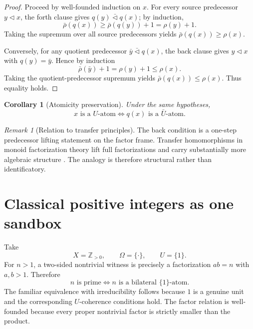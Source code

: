 \documentclass[11pt]{article}
\newtheorem{corollary}[theorem]{Corollary}
\theoremstyle{definition}
\theoremstyle{remark}
\newtheorem{remark}[theorem]{Remark}
\begin{document}
\begin{proof}
Proceed by well-founded induction on \(x\). For every source predecessor \(y\triangleleft x\), the forth clause gives \(q(y)\bar\triangleleft q(x)\); by induction,
\[
\bar\rho(q(x))\ge \bar\rho(q(y))+1=\rho(y)+1.
\]
Taking the supremum over all source predecessors yields \(\bar\rho(q(x))\ge\rho(x)\).

Conversely, for any quotient predecessor \(\bar y\bar\triangleleft q(x)\), the back clause gives \(y\triangleleft x\) with \(q(y)=\bar y\). Hence by induction
\[
\bar\rho(\bar y)+1=\rho(y)+1\le\rho(x).
\]
Taking the quotient-predecessor supremum yields \(\bar\rho(q(x))\le\rho(x)\). Thus equality holds.
\end{proof}

\begin{corollary}[Atomicity preservation]
Under the same hypotheses,
\begin{equation}
\boxed{x\text{ is a }U\text{-atom}\iff q(x)\text{ is a }\bar U\text{-atom}.}
\label{eq:atompreserve}
\end{equation}
\end{corollary}

\begin{remark}[Relation to transfer principles]
The back condition is a one-step predecessor lifting statement on the factor frame. Transfer homomorphisms in monoid factorization theory lift full factorizations and carry substantially more algebraic structure \cite{GeroldingerHalterKoch2006}. The analogy is therefore structural rather than identificatory.
\end{remark}

\section{Classical positive integers as one sandbox}

Take
\begin{equation}
X=\mathbb Z_{>0},\qquad \Omega=\{\cdot\},\qquad U=\{1\}.
\label{eq:integersandbox}
\end{equation}
For \(n>1\), a two-sided nontrivial witness is precisely a factorization \(ab=n\) with \(a,b>1\). Therefore
\begin{equation}
\boxed{n\text{ is prime}\iff n\text{ is a bilateral }\{1\}\text{-atom}.}
\label{eq:primeexample}
\end{equation}
The familiar equivalence with irreducibility follows because \(1\) is a genuine unit and the corresponding \(U\)-coherence conditions hold. The factor relation is well-founded because every proper nontrivial factor is strictly smaller than the product.
\end{document}
